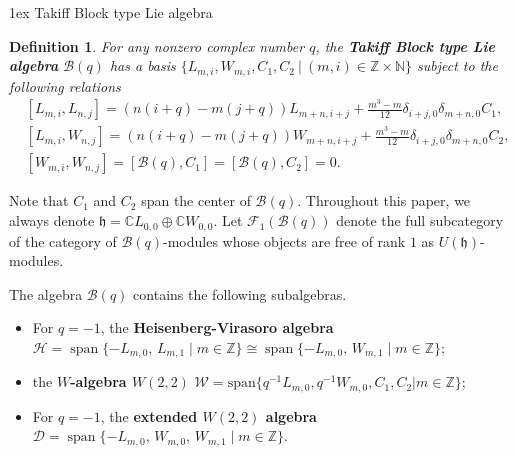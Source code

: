 \documentclass[a4paper]{amsart}
\makeatletter
\numberwithin{equation}{section}
\newtheorem{definition}[theorem]{Definition}
\def\subsection{\@startsection{subsection}{2}%
  \z@{1.5ex \@plus .5ex \@minus .2ex}%
  {1ex}%
  {\normalfont\bfseries}}
\makeatother
\begin{document}
 \subsection{Takiff Block type Lie algebra}
\begin{definition}\label{de3.1}
 For any nonzero complex number $q$, the {\bf Takiff Block type Lie algebra} $\mathcal{B}(q)$ has a basis $\big\{L_{m,i},W_{m,i},C_{1},C_{2}\ |\ (m,i)\in \mathbb{Z}\times\mathbb{N}\big\}$ subject to the following relations
 \begin{align*}
     &[L_{m,i},L_{n,j}]=(n(i+q)-m(j+q))L_{m+n,i+j}+\frac{m^{3}-m}{12}\delta_{i+j,0}\delta_{m+n,0}C_{1},\\&
		[L_{m,i},W_{n,j}]=(n(i+q)-m(j+q))W_{m+n,i+j}+\frac{m^{3}-m}{12}\delta_{i+j,0}\delta_{m+n,0}C_{2},\\&
		[W_{m,i},W_{n,j}]=[\mathcal{B}(q),C_1]=[\mathcal{B}(q),C_2]=0.
 \end{align*}
 \end{definition}
 Note that $C_{1}$ and $C_{2}$  span  the center of
   $\mathcal{B}(q)$.
 Throughout this paper, we always denote $\mathfrak{h}=\mathbb{C}L_{0,0}\oplus\mathbb{C}W_{0,0}$. Let $\mathcal F_1(\mathcal B(q))$ denote the full subcategory of the category of $\mathcal B(q)$-modules whose objects are free of rank $1$ as $U(\mathfrak h)$-modules.
 
The algebra $\mathcal{B}(q)$ contains the following subalgebras.
 \begin{itemize}
\item[\rm(1)] For  $q=-1$,  the 
{\bf Heisenberg-Virasoro algebra }$\mathcal{H}=\operatorname{span}\{-L_{m,0},\,L_{m,1}\mid m\in\mathbb{Z}\}\cong\operatorname{span}\{-L_{m,0},\,W_{m,1}\mid m\in\mathbb{Z}\}$;
\item[\rm(2)] the  {\bf $W$-algebra $W(2,2)$ }$\mathcal{W}= \text{span}\{q^{-1}L_{m,0},q^{-1}W_{m,0},C_{1},C_{2}|m\in\mathbb{Z}\}$;
\item[\rm(3)] For $q=-1$, the {\bf extended $W(2,2)$ algebra }$\mathcal{D}=\operatorname{span}\{-L_{m,0},\,W_{m,0},\,W_{m,1}\mid m\in\mathbb Z\}$.
\end{itemize}
\end{document}

